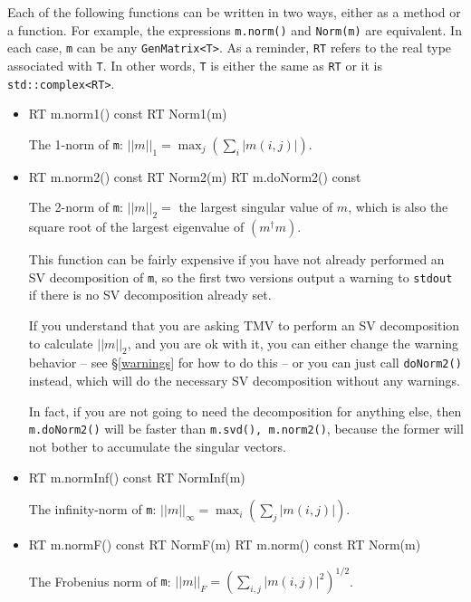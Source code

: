 \documentclass[twoside,letterpaper,11pt]{article}
\renewcommand{\tt}[1]{{\lstinline {#1}}}
\begin{document}
Each of the following functions can be written in two ways,
either as a method or a function.
For example, the expressions \tt{m.norm()} and \tt{Norm(m)}
are equivalent.  
In each case, \tt{m} can be any \tt{GenMatrix<T>}.
As a reminder, \tt{RT} refers to the real type associated with \tt{T}.
In other words, \tt{T} is either the same as \tt{RT} or it is
\tt{std::complex<RT>}.

\begin{itemize}

\item
\begin{tmvcode}
RT m.norm1() const
RT Norm1(m)
\end{tmvcode}
The 1-norm of \tt{m}: 
$||m||_1 = \max_j (\sum_i |m(i,j)|)$.

\item
\begin{tmvcode}
RT m.norm2() const
RT Norm2(m)
RT m.doNorm2() const
\end{tmvcode}
The 2-norm of \tt{m}: $||m||_2 =$ the largest singular value of $m$, which
is also the square root of the largest eigenvalue of $(m^\dagger m)$.

This function can be fairly expensive if you have not
already performed an SV decomposition of \tt{m}, so the first two versions
output a warning to \tt{stdout} if there is no SV decomposition already set.

If you understand that you are asking TMV to perform an SV decomposition
to calculate $||m||_2$, and you are ok with it, you can either change the warning
behavior -- see \S\ref{warnings} for how to do this --
or you can just call \tt{doNorm2()} instead, which will do the 
necessary SV decomposition without any warnings.

In fact, if you are not going to need the decomposition for anything else,
then \tt{m.doNorm2()} will be faster than \tt{m.svd(), m.norm2()}, because the 
former will not bother to accumulate the singular vectors.

\item
\begin{tmvcode}
RT m.normInf() const
RT NormInf(m)
\end{tmvcode}
The infinity-norm of \tt{m}: 
$||m||_\infty = \max_i (\sum_j |m(i,j)|)$.

\item
\begin{tmvcode}
RT m.normF() const
RT NormF(m)
RT m.norm() const
RT Norm(m)
\end{tmvcode}
The Frobenius norm of \tt{m}: 
$||m||_F = (\sum_{i,j} |m(i,j)|^2)^{1/2}$.


\end{itemize}
\end{document}
